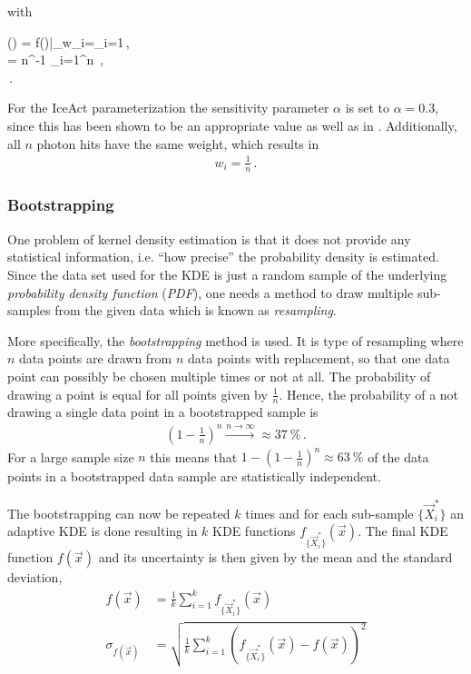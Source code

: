 with
\begin{vardescription}
	() = f()|_{w_i=\lambda_i=1}\,,\\
	 = n^{-1} \sum_{i=1}^{n} \,,\\
	\alpha\in[0,1]\,.
\end{vardescription}
For the IceAct parameterization the sensitivity parameter $\alpha$ is set to $\alpha=\num{0.3}$, since this has been shown to be an appropriate value as well as in \cite{kde:schoenen}. Additionally, all $n$ photon hits have the same weight, which results in \cite{kde:schoenen,kde:wangwang}
\begin{align}
	w_i = \frac{1}{n}\,.
\end{align}

\subsubsection{Bootstrapping}

One problem of kernel density estimation is that it does not provide any statistical information, i.e. \enquote{how precise} the probability density is estimated. Since the data set used for the KDE is just a random sample of the underlying \textit{probability density function} (\textit{PDF}), one needs a method to draw multiple sub-samples from the given data which is known as \textit{resampling}.

More specifically, the \textit{bootstrapping} method is used. It is type of resampling where $n$ data points are drawn from $n$ data points with replacement, so that one data point can possibly be chosen multiple times or not at all. The probability of drawing a point is equal for all points given by $\frac{1}{n}$. Hence, the probability of a not drawing a single data point in a bootstrapped sample is
\begin{align}
	\left(1-\frac{1}{n}\right)^n \overset{n\to\infty}{\longrightarrow} \approx\SI{37}{\percent}\,.
\end{align}
For a large sample size $n$ this means that $1-\left(1-\frac{1}{n}\right)^n\approx\SI{63}{\percent}$ of the data points in a bootstrapped data sample are statistically independent.

The bootstrapping can now be repeated $k$ times and for each sub-sample $\{\vec{X}_i^\ast\}$ an adaptive KDE is done resulting in $k$ KDE functions $f_{\{\vec{X}_i^\ast\}}(\vec{x})$. The final KDE function $f(\vec{x})$ and its uncertainty is then given by the mean and the standard deviation,~\cite{kde:bootstrapping,kde:schoenen}
\begin{subequations}
	\begin{align}
		f(\vec{x}) &= \frac{1}{k}\sum_{i=1}^{k} f_{\{\vec{X}_i^\ast\}}(\vec{x})\\
		\sigma_{f(\vec{x})}	&= \sqrt{\frac{1}{k}\sum_{i=1}^{k}\left(f_{\{\vec{X}_i^\ast\}}(\vec{x}) - f(\vec{x})\right)^2}
	\end{align}
\end{subequations}

